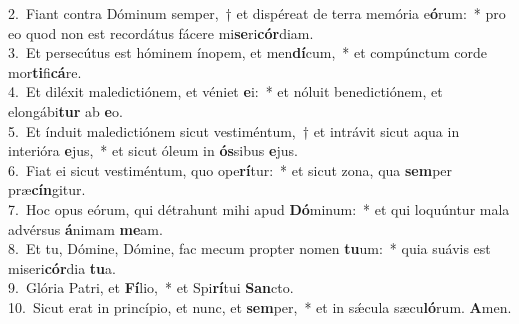 {2.~}Fiant contra Dóminum semper,~† et dispéreat de terra memória e\textbf{ó}rum:~* pro eo quod non est recordátus fácere mi\textbf{se}ri\textbf{cór}diam.\\
{3.~}Et persecútus est hóminem ínopem, et men\textbf{dí}cum,~* et compúnctum corde mor\textbf{ti}fi\textbf{cá}re.\\
{4.~}Et diléxit maledictiónem, et véniet \textbf{e}i:~* et nóluit benedictiónem, et elongábi\textbf{tur} ab \textbf{e}o.\\
{5.~}Et índuit maledictiónem sicut vestiméntum,~† et intrávit sicut aqua in interióra \textbf{e}jus,~* et sicut óleum in \textbf{ós}sibus \textbf{e}jus.\\
{6.~}Fiat ei sicut vestiméntum, quo ope\textbf{rí}tur:~* et sicut zona, qua \textbf{sem}per præ\textbf{cín}gitur.\\
{7.~}Hoc opus eórum, qui détrahunt mihi apud \textbf{Dó}minum:~* et qui loquúntur mala advérsus \textbf{á}nimam \textbf{me}am.\\
{8.~}Et tu, Dómine, Dómine, fac mecum propter nomen \textbf{tu}um:~* quia suávis est miseri\textbf{cór}dia \textbf{tu}a.\\
{9.~}Glória Patri, et \textbf{Fí}lio,~* et Spi\textbf{rí}tui \textbf{San}cto.\\
{10.~}Sicut erat in princípio, et nunc, et \textbf{sem}per,~* et in sǽcula sæcu\textbf{ló}rum. \textbf{A}men.\\
